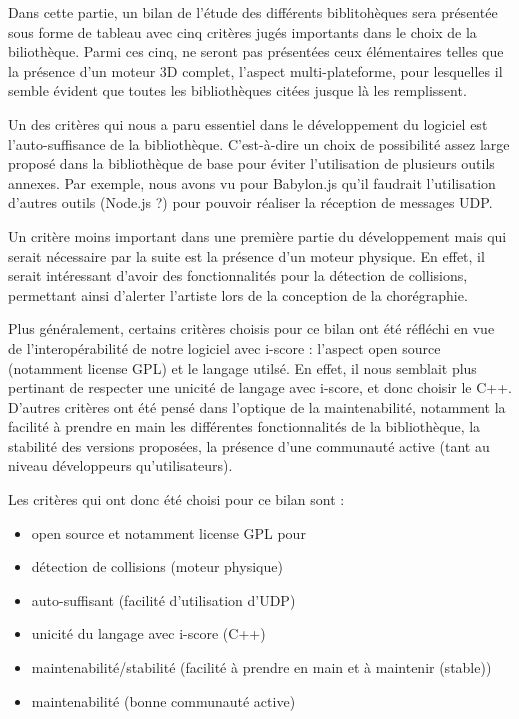 
Dans cette partie, un bilan de l'étude des différents biblitohèques sera présentée sous forme de tableau avec cinq critères jugés importants dans le choix de la biliothèque. Parmi ces cinq, ne seront pas présentées ceux élémentaires telles que la présence d'un moteur 3D complet, l'aspect multi-plateforme, pour lesquelles il semble évident que toutes les bibliothèques citées jusque là les remplissent.

Un des critères qui nous a paru essentiel dans le développement du logiciel est l'auto-suffisance de la bibliothèque. C'est-à-dire un choix de possibilité assez large proposé dans la bibliothèque de base pour éviter l'utilisation de plusieurs outils annexes. Par exemple, nous avons vu pour Babylon.js qu'il faudrait l'utilisation d'autres outils (Node.js ?) pour pouvoir réaliser la réception de messages UDP. 

Un critère moins important dans une première partie du développement mais qui serait nécessaire par la suite est la présence d'un moteur physique. En effet, il serait intéressant d'avoir des fonctionnalités pour la détection de collisions, permettant ainsi d'alerter l'artiste lors de la conception de la chorégraphie.

Plus généralement, certains critères choisis pour ce bilan ont été réfléchi en vue de l'interopérabilité de notre logiciel avec i-score : l'aspect open source (notamment license GPL) et le langage utilsé. En effet, il nous semblait plus pertinant de respecter une unicité de langage avec i-score, et donc choisir le C++. 
D'autres critères ont été pensé dans l'optique de la maintenabilité, notamment la facilité à prendre en main les différentes fonctionnalités de la bibliothèque, la stabilité des versions proposées, la présence d'une communauté active (tant au niveau développeurs qu'utilisateurs).



Les critères qui ont donc été choisi pour ce bilan sont : 
\begin{itemize}
\item open source et notamment license GPL pour 
\item détection de collisions (moteur physique)
\item auto-suffisant (facilité d'utilisation d'UDP)
\item unicité du langage avec i-score (C++)
\item maintenabilité/stabilité  (facilité à prendre en main et à maintenir (stable))
\item maintenabilité (bonne communauté active)
\end{itemize} 
 



